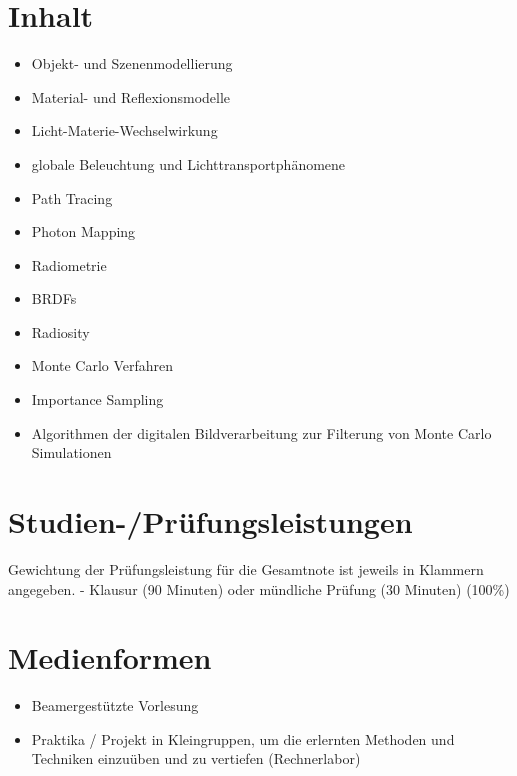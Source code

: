 \section*{Inhalt\label{/mi-2017/modulbeschreibungen-master/MA_VC_Modul_PhotorealistischeBildsynthese}}\label{inhaltpathlabelmi-2017modulbeschreibungen-mastermaux5fvcux5fmodulux5fphotorealistischebildsynthese}

\begin{itemize}
\tightlist
\item
  Objekt- und Szenenmodellierung
\item
  Material- und Reflexionsmodelle
\item
  Licht-Materie-Wechselwirkung
\item
  globale Beleuchtung und Lichttransportphänomene
\item
  Path Tracing
\item
  Photon Mapping
\item
  Radiometrie
\item
  BRDFs
\item
  Radiosity
\item
  Monte Carlo Verfahren
\item
  Importance Sampling
\item
  Algorithmen der digitalen Bildverarbeitung zur Filterung von Monte
  Carlo Simulationen
\end{itemize}

\section*{Studien-/Prüfungsleistungen\label{/mi-2017/modulbeschreibungen-master/MA_VC_Modul_PhotorealistischeBildsynthese}}\label{studien-pruxfcfungsleistungenpathlabelmi-2017modulbeschreibungen-mastermaux5fvcux5fmodulux5fphotorealistischebildsynthese}

Gewichtung der Prüfungsleistung für die Gesamtnote ist jeweils in
Klammern angegeben. - Klausur (90 Minuten) oder mündliche Prüfung (30
Minuten) (100\%)

\section*{Medienformen\label{/mi-2017/modulbeschreibungen-master/MA_VC_Modul_PhotorealistischeBildsynthese}}\label{medienformenpathlabelmi-2017modulbeschreibungen-mastermaux5fvcux5fmodulux5fphotorealistischebildsynthese}

\begin{itemize}
\tightlist
\item
  Beamergestützte Vorlesung
\item
  Praktika / Projekt in Kleingruppen, um die erlernten Methoden und
  Techniken einzuüben und zu vertiefen (Rechnerlabor)
\end{itemize}

